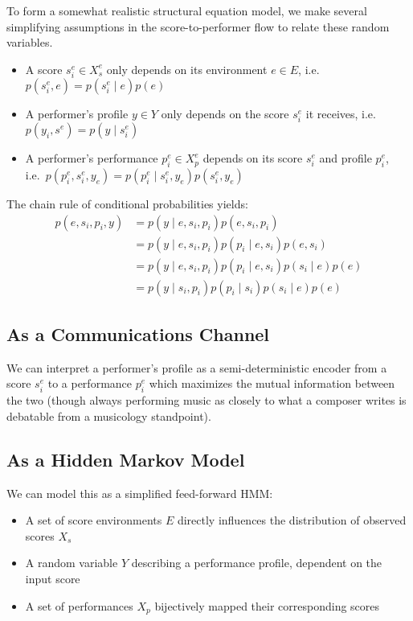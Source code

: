 \documentclass[conference]{IEEEtran}
\begin{document}
To form a somewhat realistic structural equation model, we make several simplifying assumptions in the score-to-performer flow to relate these random variables.
\begin{itemize}
    \item A score \(s_i^e \in X_s^e\) only depends on its environment \(e \in E\), i.e.\ \(p(s_i^e, e) = p(s_i^e \mid e) p(e)\)
    \item A performer's profile \(y \in Y\) only depends on the score \(s_i^e\) it receives, i.e.\ \(p(y_i, s^e) = p(y \mid s_i^e)\)
    \item A performer's performance \(p_i^e \in X_p^e\) depends on its score \(s_i^e\) and profile \(p_i^e\), i.e.\ \(p(p_i^e, s_i^e, y_e) = p(p_i^e \mid s_i^e, y_e) p(s_i^e, y_e)\)
\end{itemize}

The chain rule of conditional probabilities yields: \parencite{Berdahl, Degirmenci}
\begin{align*}
    p(e, s_i, p_i, y)
     & = p(y \mid e, s_i, p_i) p(e, s_i, p_i)                        \\
     & = p(y \mid e, s_i, p_i) p(p_i \mid e, s_i) p(e, s_i)          \\
     & = p(y \mid e, s_i, p_i) p(p_i \mid e, s_i) p(s_i \mid e) p(e) \\
     & = p(y \mid s_i, p_i) p(p_i \mid s_i) p(s_i \mid e) p(e)
\end{align*}

\subsection{As a Communications Channel}

We can interpret a performer's profile as a semi-deterministic encoder from a score \(s_i^e\) to a performance \(p_i^e\) which maximizes the mutual information between the two (though always performing music as closely to what a composer writes is debatable from a musicology standpoint). \parencite{Berdahl, Meyer}

\subsection{As a Hidden Markov Model}

We can model this as a simplified feed-forward HMM\@:
\begin{itemize}
    \item A set of score environments \(E\) directly influences the distribution of observed scores \(X_s\)
    \item A random variable \(Y\) describing a performance profile, dependent on the input score
    \item A set of performances \(X_p\) bijectively mapped their corresponding scores
\end{itemize}
\end{document}

